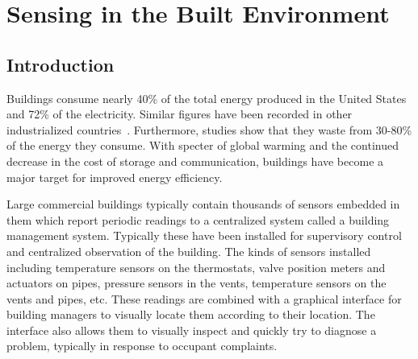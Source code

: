 \chapter{Sensing in the Built Environment}







\section{Introduction}
Buildings consume nearly 40\% of the total energy produced in the United States and 72\% of the electricity.  Similar figures 
have been recorded in other industrialized countries~\cite{buildings_study}.  Furthermore, studies show that they waste from
30-80\% of the energy they consume.  With specter of global warming and the continued decrease in the cost of storage and 
communication, buildings have become a major target for improved energy efficiency.

Large commercial buildings typically contain thousands of sensors embedded in them which report periodic readings to 
a centralized system called a building management system.  Typically these have been installed for supervisory control and
centralized observation of the building.  The kinds of sensors installed including temperature sensors on the thermostats,
valve position meters and actuators on pipes, pressure sensors in the vents, temperature sensors on the vents and pipes, etc.
These readings are combined with a graphical interface for building managers to visually locate them according to their location.
The interface also allows them to visually inspect and quickly try to diagnose a problem, typically in response to occupant
complaints.

